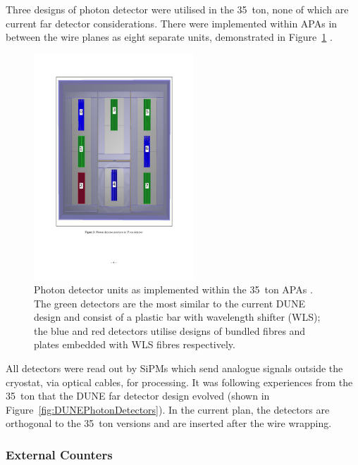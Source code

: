 Three designs of photon detector were utilised in the 35~ton, none of which are current far detector considerations.  There were implemented within APAs in between the wire planes as eight separate units, demonstrated in Figure~\ref{fig:35tonPhotonDetectors} \cite{35tonPhotonDetectors}.

\begin{figure}
  \centering
  \includegraphics[width=6cm]{35tonPhotonDetectors.pdf}
  \caption[Photon detector units as implemented within the 35~ton APAs.]{Photon detector units as implemented within the 35~ton APAs \cite{35tonPhotonDetectors}.  The green detectors are the most similar to the current DUNE design and consist of a plastic bar with wavelength shifter (WLS); the blue and red detectors utilise designs of bundled fibres and plates embedded with WLS fibres respectively.}
  \label{fig:35tonPhotonDetectors}
\end{figure}

All detectors were read out by SiPMs which send analogue signals outside the cryostat, via optical cables, for processing.  It was following experiences from the 35~ton that the DUNE far detector design evolved (shown in Figure~\ref{fig:DUNEPhotonDetectors}).  In the current plan, the detectors are orthogonal to the 35~ton versions and are inserted after the wire wrapping.

\subsubsection{External Counters}\label{sec:35tonExternalCounters}

